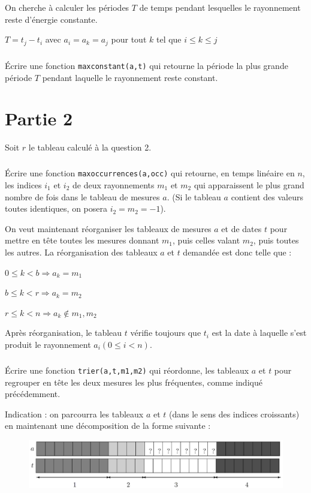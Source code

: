 \documentclass[10pt,fleqn]{article} %
\begin{document}
On cherche à calculer les périodes $T$ de temps pendant lesquelles le rayonnement reste d’énergie constante.

$T = t_j - t_i$ avec $a_i = a_k = a_j$ pour tout $k$ tel que $i \le k \le j$

\subparagraph{} Écrire une fonction \texttt{maxconstant(a,t)} qui retourne la période la plus grande période $T$ pendant laquelle le rayonnement reste constant.

\section{Partie 2}

Soit $r$ le tableau calculé à la question 2.

\subparagraph{} Écrire une fonction \texttt{maxoccurrences(a,occ)} qui retourne, en temps linéaire en $n$, les indices $i_1$ et $i_2$ de deux rayonnements $m_1$ et $m_2$ qui apparaissent le plus grand nombre de fois dans le tableau de mesures $a$.
(Si le tableau $a$ contient des valeurs toutes identiques, on posera $i_2=m_2 = -1$).

On veut maintenant réorganiser les tableaux de mesures $a$ et de dates $t$ pour mettre en tête toutes les mesures donnant $m_1$, puis celles valant $m_2$, puis toutes les autres.
La réorganisation des tableaux $a$ et $t$ demandée est donc telle que :

$0\le k<b \Rightarrow a_k=m_1$

$b\le k<r \Rightarrow a_k=m_2$

$r\le k<n \Rightarrow a_k \notin {m_1,m_2}$

Après réorganisation, le tableau $t$ vérifie toujours que $t_i$ est la date à laquelle s’est produit le rayonnement $a_i (0 \le i < n)$.



\subparagraph{} Écrire une fonction \texttt{trier(a,t,m1,m2)} qui réordonne, les tableaux $a$ et $t$ pour regrouper en tête les deux mesures les plus fréquentes, comme indiqué précédemment.

Indication : on parcourra les tableaux $a$ et $t$ (dans le sens des indices croissants) en maintenant une décomposition de la forme suivante :

\begin{figure}[h]
\begin{center}
\includegraphics[scale=0.15]{images/Image1.jpg} 
\end{center}
\end{figure}
\end{document}
